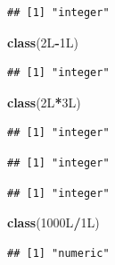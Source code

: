 \documentclass[]{book}
\newenvironment{Shaded}{\begin{snugshade}}{\end{snugshade}}
\newcommand{\KeywordTok}[1]{\textcolor[rgb]{0.13,0.29,0.53}{\textbf{#1}}}
\newcommand{\NormalTok}[1]{#1}
\newcommand{\OperatorTok}[1]{\textcolor[rgb]{0.81,0.36,0.00}{\textbf{#1}}}
\begin{document}
\begin{verbatim}
## [1] "integer"
\end{verbatim}

\begin{Shaded}
\begin{Highlighting}[]
\KeywordTok{class}\NormalTok{(2L}\OperatorTok{-}\NormalTok{1L)}
\end{Highlighting}
\end{Shaded}

\begin{verbatim}
## [1] "integer"
\end{verbatim}

\begin{Shaded}
\begin{Highlighting}[]
\KeywordTok{class}\NormalTok{(2L}\OperatorTok{*}\NormalTok{3L)}
\end{Highlighting}
\end{Shaded}

\begin{verbatim}
## [1] "integer"
\end{verbatim}

\begin{Shaded}
\end{Shaded}

\begin{verbatim}
## [1] "integer"
\end{verbatim}

\begin{Shaded}
\end{Shaded}

\begin{verbatim}
## [1] "integer"
\end{verbatim}

\begin{Shaded}
\begin{Highlighting}[]
\KeywordTok{class}\NormalTok{(1000L}\OperatorTok{/}\NormalTok{1L)}
\end{Highlighting}
\end{Shaded}

\begin{verbatim}
## [1] "numeric"
\end{verbatim}
\end{document}
